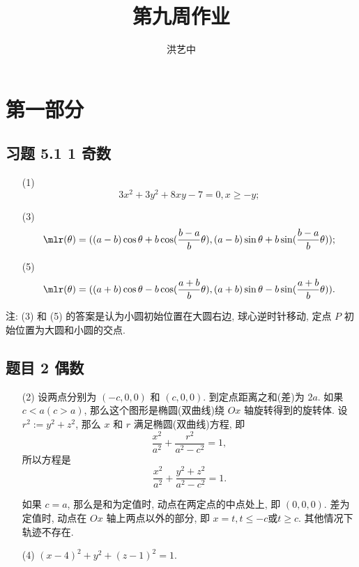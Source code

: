 \title{第九周作业}
\author{洪艺中}
\maketitle
\section{第一部分}
\newcommand{\lvec}[1]{\overrightarrow{#1}}
\subsection*{ 习题 5.1 1 奇数 }
\begin{solution}
\begin{enumerate}
    \item[(1)] 
    \[
        3x^2 + 3y^2 + 8xy - 7 = 0, x \geqslant -y;
    \]
    \item[(3)] 
    \[
        \mlr(\theta) = ((a - b) \cos \theta + b \cos (\frac{b - a}{b}\theta), (a - b) \sin \theta + b \sin (\frac{b - a}{b}\theta));
    \]
    \item[(5)]
    \[
        \mlr(\theta) = ((a + b) \cos \theta - b \cos (\frac{a + b}{b}\theta), (a +  b) \sin \theta - b \sin (\frac{a + b}{b}\theta)).
    \]
\end{enumerate}

注: (3) 和 (5) 的答案是认为小圆初始位置在大圆右边, 球心逆时针移动, 定点 $P$ 初始位置为大圆和小圆的交点.
\end{solution}

\subsection*{ 题目 2 偶数 }
\begin{solution}
\begin{enumerate}
    \item[(2)] 设两点分别为 $(-c, 0, 0)$ 和 $(c, 0, 0)$. 到定点距离之和(差)为 $2a$. 如果 $c < a(c > a)$, 那么这个图形是椭圆(双曲线)绕 $Ox$ 轴旋转得到的旋转体. 设 $r^2 := y^2 + z^2$, 那么 $x$ 和 $r$ 满足椭圆(双曲线)方程, 即
    \[
    \frac{x^2}{a^2} + \frac{r^2}{a^2 - c^2} = 1,
    \]
    所以方程是
    \[
        \frac{x^2}{a^2} + \frac{y^2 + z^2}{a^2 - c^2} = 1.
    \]

    如果 $c = a$, 那么是和为定值时, 动点在两定点的中点处上, 即 $(0, 0, 0)$. 差为定值时, 动点在 $Ox$ 轴上两点以外的部分, 即 $x = t, t \leqslant -c \text{或}  t \geqslant c$. 其他情况下轨迹不存在.
    \item[(4)] $(x - 4)^2 + y^2 + (z - 1)^2 = 1$.
\end{enumerate}
\end{solution}

